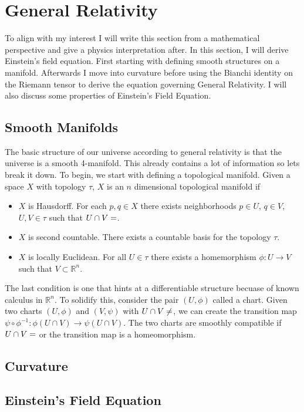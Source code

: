 \section{General Relativity}

To align with my interest I will write this section from a mathematical perspective and give a physics interpretation after. In this section, I will derive Einstein's field equation. First starting with defining smooth structures on a manifold. Afterwards I move into curvature before using the Bianchi identity on the Riemann tensor to derive the equation governing General Relativity. I will also discuss some properties of Einstein's Field Equation.
\subsection{Smooth Manifolds}
The basic structure of our universe according to general relativity is that the universe is a smooth 4-manifold. This already contains a lot of information so lets break it down.
To begin, we start with defining a topological manifold. Given a space $X$ with topology $\tau$, $X$ is an $n$ dimensional topological manifold if
\begin{itemize}
	\item $X$ is Hausdorff. For each $p,q \in X$ there exists neighborhoods $p\in U$, $q\in V$, $U,V\in \tau$ such that $U \cap V = \empty$.
	\item $X$ is second countable. There exists a countable basis for the topology $\tau$.
	\item $X$ is locally Euclidean. For all $U\in\tau$ there exists a homemorphism $\phi:U\rightarrow V$ such that $V\subset \mathbb{R}^n$.
\end{itemize}
The last condition is one that hints at a differentiable structure becuase of known calculus in $\mathbb{R}^n$. To solidify this, consider the pair $(U,\phi)$ called a chart. Given two charts $(U,\phi)$ and $(V,\psi)$ with $U\cap V \neq \empty$, we can create the transition map $\psi \circ \phi^{-1}:\phi(U\cap V) \rightarrow \psi(U\cap V)$. The two charts are smoothly compatible if $U\cap V=\empty $ or the transition map is a homeomorphism.

\subsection{Curvature}
\subsection{Einstein's Field Equation}

